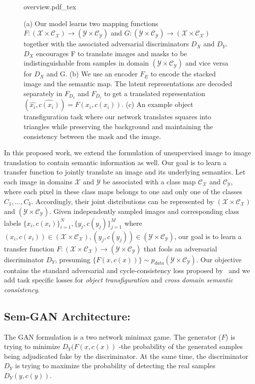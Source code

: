 \begin{figure*}[!hbpt]
    \centering
    \def\svgwidth{\textwidth}
    {overview.pdf_tex}
    \caption{ (a) Our model learns two mapping functions $F: (\mathcal{X \times C_X}) \to (\mathcal{Y \times C_Y})$ and $G: (\mathcal{Y \times C_Y}) \to (\mathcal{X \times C_X})$ together with the associated adversarial discriminators $D_X$ and $D_Y$. $D_X$ encourages F to translate images and masks to be indistinguishable from samples in domain $(\mathcal{Y \times C_Y})$ and vice versa for $D_X$ and G. (b) We use an encoder $F_E$ to encode the stacked image and the semantic map. The latent representations are decoded separately in $F_{D_x}$ and $F_{D_c}$ to get a translated representation $(\widehat{x_i},\widehat{c(x_i)}) = F(x_i, c(x_i))$. (c) An example object transfiguration task where our network translates squares into triangles while preserving the background and maintaining the consistency between the mask and the image.\label{fig:overview_prop}}
    
\end{figure*}
In this proposed work, we extend the formulation of unsupervised image to image translation to contain semantic information as well. Our goal is to learn a transfer function to jointly translate an image and its underlying semantics. Let each image in  domains $\mathcal{X}$ and $\mathcal{Y}$ be associated with a class map $\mathcal{C_X}$ and $\mathcal{C_Y}$, where each pixel in these class maps belongs to one and only one of the classes $C_1, ..., C_k$. Accordingly, their joint distributions can be represented by $\left(\mathcal{ X \times C_X}\right)$ and $\left(\mathcal{Y \times C_Y}\right)$.  Given independently sampled images and corresponding class labels $\{x_i,c(x_i)\}_{i=1}^N, \{y_j,c(y_j)\}_{j=1}^M$ where  $(x_i,c(x_i)) \in \left(\mathcal{ X \times C_X}\right), (y_j,c(y_j)) \in \left(\mathcal{ Y \times C_Y}\right)$, our goal is to learn a transfer function $F:\left(\mathcal{ X \times C_X}\right) \to \left(\mathcal{ Y \times C_Y}\right)$ that fools an adversarial discriminator $D_Y$, presuming $\{F(x,c(x))\} \sim p_{data}(\mathcal{ Y \times C_Y})$. Our objective contains the standard adversarial and cycle-consistency loss proposed by~\cite{goodfellow_generative_2014, zhu_unpaired_2017} and we add task specific losses for \textit{object transfiguration} and \textit{cross domain semantic consistency}. 

\subsection{Sem-GAN Architecture:}
The GAN formulation is a two network minimax game. The generator ($F$) is trying to minimize $D_Y(F(x,c(x))$ -the probability of the generated samples being adjudicated fake by the discriminator. At the same time, the discriminator $D_Y$ is trying to maximize the probability of detecting the real samples $D_Y(y,c(y))$. 

